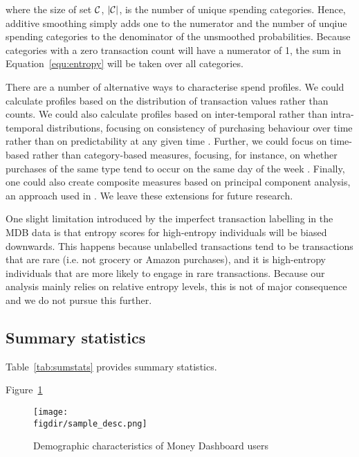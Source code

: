 \noindent where the size of set $\mathcal{C}$, $|\mathcal{C}|$, is the number of unique
spending categories. Hence, additive smoothing simply adds one to the numerator
and the number of unqiue spending categories to the denominator of the
unsmoothed probabilities. Because categories with a zero transaction count will
have a numerator of 1, the sum in Equation~\ref{equ:entropy} will be taken over
all categories.

There are a number of alternative ways to characterise spend profiles. We could
calculate profiles based on the distribution of transaction values rather than
counts. We could also calculate profiles based on inter-temporal rather than
intra-temporal distributions, focusing on consistency of purchasing behaviour
over time rather than on predictability at any given time
\citep{krumme2013predictability}. Further, we could focus on time-based rather
than category-based measures, focusing, for instance, on whether purchases of
the same type tend to occur on the same day of the week
\citep{guidotti2015behavioral}. Finally, one could also create composite
measures based on principal component analysis, an approach used in
\citet{eagle2010network}. We leave these extensions for future research.

One slight limitation introduced by the imperfect transaction labelling in the
MDB data is that entropy scores for high-entropy individuals will be biased
downwards. This happens because unlabelled transactions tend to be transactions
that are rare (i.e. not grocery or Amazon purchases), and it is high-entropy
individuals that are more likely to engage in rare transactions. Because our
analysis mainly relies on relative entropy levels, this is not of major
consequence and we do not pursue this further.


\subsection{Summary statistics}%
\label{par:summary_statistics}

Table~\ref{tab:sumstats} provides summary statistics.



Figure~\ref{fig:sample_desc}
\begin{figure}[H]
    \caption{Demographic characteristics of Money Dashboard users}
    \label{fig:sample_desc}
    \begin{center}
        \texttt{[image: \\figdir/sample\_desc.png]}
    \end{center}
\end{figure}


